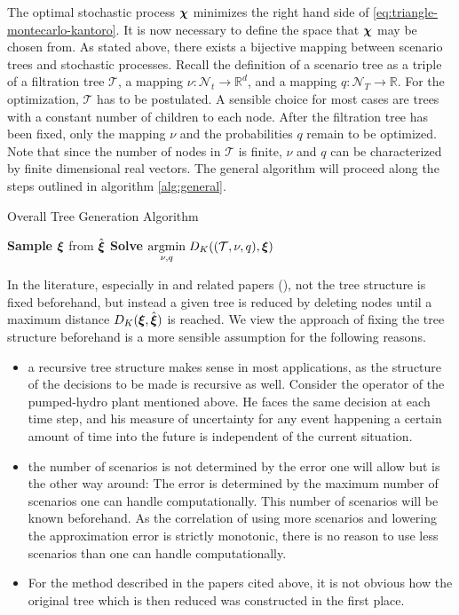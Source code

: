 The optimal stochastic process $\boldsymbol\chi$ minimizes the right hand side of \eqref{eq:triangle-montecarlo-kantoro}.
It is now necessary to define the space that $\boldsymbol\chi$ may be chosen from.
As stated above, there exists a bijective mapping between scenario trees and stochastic processes.
Recall the definition of a scenario tree as a triple of a filtration tree $\mathcal{T}$, a mapping $\nu:\mathcal{N}_t\rightarrow\mathbb{R}^d$, and a mapping $q:\mathcal{N}_T\rightarrow\mathbb{R}$.
For the optimization, $\mathcal{T}$ has to be postulated.
A sensible choice for most cases are trees with a constant number of children to each node.
After the filtration tree has been fixed, only the mapping $\nu$ and the probabilities $q$ remain to be optimized.
Note that since the number of nodes in $\mathcal{T}$ is finite, $\nu$ and $q$ can be characterized by finite dimensional real vectors.
The general algorithm will proceed along the steps outlined in algorithm \ref{alg:general}.
\begin{algorithm}
  \label{alg:general}
  \caption{Overall Tree Generation Algorithm}
  \BlankLine
  \textbf{Sample} $\boldsymbol\xi$ from $\hat{\boldsymbol\xi}$\;
  \textbf{Solve} $\underset{\nu,q}{\operatorname{argmin}}\; D_K((\mathcal{T},\nu, q), \boldsymbol\xi)$\;
\end{algorithm}

In the literature, especially in  and related papers (\cite{Dupacova2003,Heitsch2003,Heitsch2009a,Heitsch2010}), not the tree structure is fixed beforehand, but instead a given tree is reduced by deleting nodes until a maximum distance $D_K(\boldsymbol\xi,\hat{\boldsymbol\xi})$ is reached.
We view the approach of fixing the tree structure beforehand is a more sensible assumption for the following reasons.
\begin{itemize}
\item a recursive tree structure makes sense in most applications, as the structure of the decisions to be made is recursive as well.
Consider the operator of the pumped-hydro plant mentioned above.
He faces the same decision at each time step, and his measure of uncertainty for any event happening a certain amount of time into the future is independent of the current situation.
\item the number of scenarios is not determined by the error one will allow but is the other way around: The error is determined by the maximum number of scenarios one can handle computationally.
This number of scenarios will be known beforehand.
As the correlation of using more scenarios and lowering the approximation error is strictly monotonic, there is no reason to use less scenarios than one can handle computationally.
\item For the method described in the papers cited above, it is not obvious how the original tree which is then reduced was constructed in the first place.
\end{itemize}

